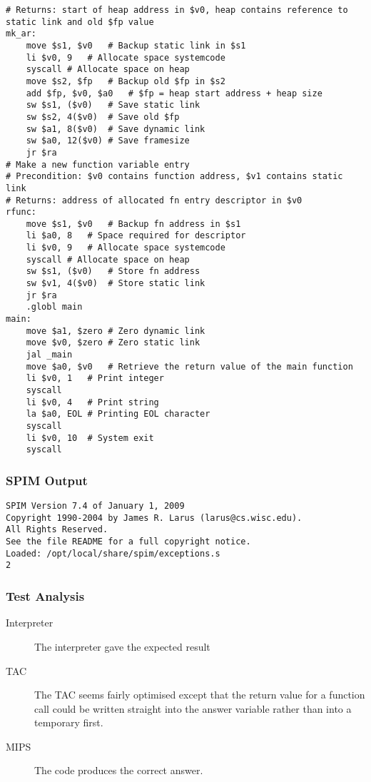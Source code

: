 \begin{lstlisting}[showstringspaces=false,breaklines=true,backgroundcolor=\color{light-gray}, captionpos=b]
# Returns: start of heap address in $v0, heap contains reference to static link and old $fp value
mk_ar:
	move $s1, $v0	# Backup static link in $s1
	li $v0, 9	# Allocate space systemcode
	syscall	# Allocate space on heap
	move $s2, $fp	# Backup old $fp in $s2
	add $fp, $v0, $a0	# $fp = heap start address + heap size
	sw $s1, ($v0)	# Save static link
	sw $s2, 4($v0)	# Save old $fp
	sw $a1, 8($v0)	# Save dynamic link
	sw $a0, 12($v0)	# Save framesize
	jr $ra
# Make a new function variable entry
# Precondition: $v0 contains function address, $v1 contains static link
# Returns: address of allocated fn entry descriptor in $v0
rfunc:
	move $s1, $v0	# Backup fn address in $s1
	li $a0, 8	# Space required for descriptor
	li $v0, 9	# Allocate space systemcode
	syscall	# Allocate space on heap
	sw $s1, ($v0)	# Store fn address
	sw $v1, 4($v0)	# Store static link
	jr $ra
	.globl main
main:
	move $a1, $zero	# Zero dynamic link
	move $v0, $zero	# Zero static link
	jal _main
	move $a0, $v0	# Retrieve the return value of the main function
	li $v0, 1	# Print integer
	syscall
	li $v0, 4	# Print string
	la $a0, EOL	# Printing EOL character
	syscall
	li $v0, 10	# System exit
	syscall

\end{lstlisting}\subsubsection{SPIM Output}
\begin{verbatim}
SPIM Version 7.4 of January 1, 2009
Copyright 1990-2004 by James R. Larus (larus@cs.wisc.edu).
All Rights Reserved.
See the file README for a full copyright notice.
Loaded: /opt/local/share/spim/exceptions.s
2
\end{verbatim}
\subsubsection{Test Analysis}
\begin{description}
	\item[Interpreter] The interpreter gave the expected result
	\item[TAC] The TAC seems fairly optimised except that the return value for a function call could be written straight into the answer variable rather than into a temporary first.
	\item[MIPS] The code produces the correct answer.
\end{description}